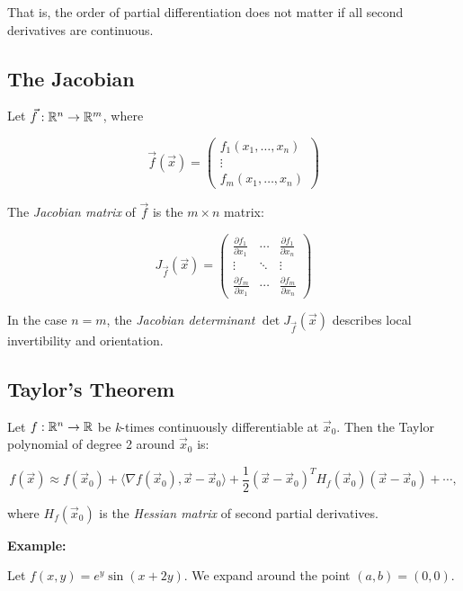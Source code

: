 That is, the order of partial differentiation does not matter if all second derivatives are continuous.

\subsection{The Jacobian}

Let \( \vec{f} : \mathbb{R}^n \to \mathbb{R}^m \), where

\[
    \vec{f}(\vec{x}) = \begin{pmatrix}
    f_1(x_1, \dots, x_n) \\
    \vdots \\
    f_m(x_1, \dots, x_n)
    \end{pmatrix}
\]

The \emph{Jacobian matrix} of \( \vec{f} \) is the \( m \times n \) matrix:

\[
    J_{\vec{f}}(\vec{x}) = \begin{pmatrix}
    \frac{\partial f_1}{\partial x_1} & \cdots & \frac{\partial f_1}{\partial x_n} \\
    \vdots & \ddots & \vdots \\
    \frac{\partial f_m}{\partial x_1} & \cdots & \frac{\partial f_m}{\partial x_n}
    \end{pmatrix}
\]

In the case \( n = m \), the \emph{Jacobian determinant} \( \det J_{\vec{f}}(\vec{x}) \) 
describes local invertibility and orientation.


\subsection{Taylor's Theorem}

Let \( f : \mathbb{R}^n \to \mathbb{R} \) be \emph{k}-times continuously differentiable at \( \vec{x}_0 \). Then 
the Taylor polynomial of degree 2 around \( \vec{x}_0 \) is:

\[
    f(\vec{x}) \approx f(\vec{x}_0) + \langle \nabla f(\vec{x}_0), \vec{x} - \vec{x}_0 \rangle + 
    \frac{1}{2} {(\vec{x} - \vec{x}_0)}^T H_f(\vec{x}_0)(\vec{x} - \vec{x}_0) + \cdots,
\]

where \( H_f(\vec{x}_0) \) is the \emph{Hessian matrix} of second partial derivatives.
\vspace{\baselineskip}

\textbf{Example:} 
\vspace{\baselineskip}

Let \( f(x, y) = e^y \sin(x + 2y) \). We expand around the point \( (a, b) = (0, 0) \).
\vspace{\baselineskip}

